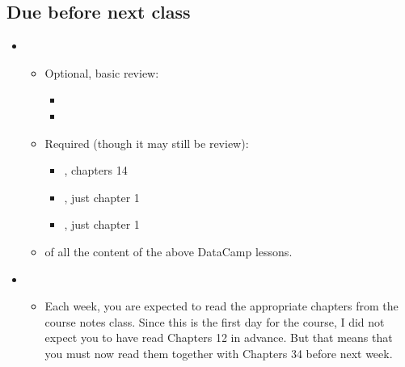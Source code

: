 \documentclass[letterpaper,10pt,english]{sphinxmanual}
\begin{document}
\subsection{Due before next class}
\label{\detokenize{course-schedule:due-before-next-class}}\begin{itemize}
\item {} 
\begin{itemize}
\item {} 
Optional, basic review:
\begin{itemize}
\item {} 

\item {} 

\end{itemize}

\item {} 
Required (though it may still be review):
\begin{itemize}
\item {} 
, chapters 1\sphinxhyphen{}4

\item {} 
, just chapter 1

\item {} 
, just chapter 1

\end{itemize}

\item {} 
 of all the content of the above DataCamp lessons.

\end{itemize}

\item {} 
\begin{itemize}
\item {} 
Each week, you are expected to read the appropriate chapters from the course notes  class.  Since this is the first day for the course, I did not expect you to have read Chapters 1\sphinxhyphen{}2 in advance.  But that means that you must now read them together with Chapters 3\sphinxhyphen{}4 before next week.


\end{itemize}
\end{itemize}
\end{document}
